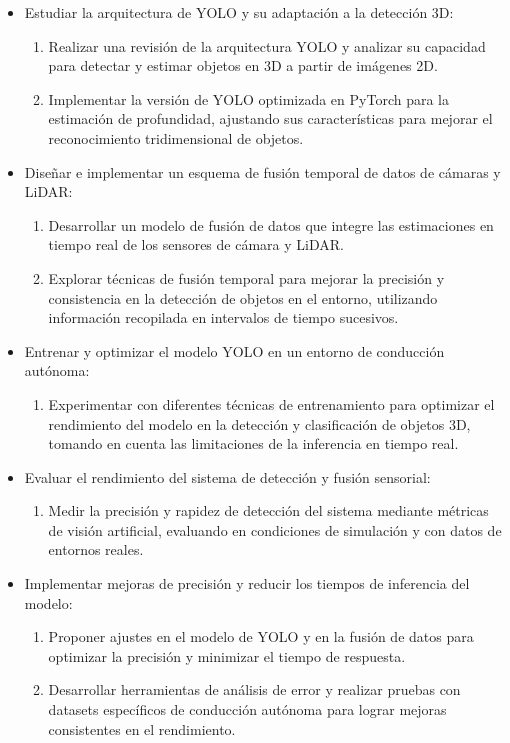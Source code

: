 \begin{itemize}
	\item Estudiar la arquitectura de YOLO y su adaptación a la detección 3D:
	\begin{enumerate}
		\item Realizar una revisión de la arquitectura YOLO y analizar su capacidad para detectar y estimar objetos en 3D a partir de imágenes 2D.
		\item Implementar la versión de YOLO optimizada en PyTorch para la estimación de profundidad, ajustando sus características para mejorar el reconocimiento tridimensional de objetos.
	\end{enumerate}
	
	\item Diseñar e implementar un esquema de fusión temporal de datos de cámaras y LiDAR:
	\begin{enumerate}
		\item Desarrollar un modelo de fusión de datos que integre las estimaciones en tiempo real de los sensores de cámara y LiDAR.
		\item Explorar técnicas de fusión temporal para mejorar la precisión y consistencia en la detección de objetos en el entorno, utilizando información recopilada en intervalos de tiempo sucesivos.
	\end{enumerate}
	
	\item Entrenar y optimizar el modelo YOLO en un entorno de conducción autónoma:
	\begin{enumerate}
		\item Experimentar con diferentes técnicas de entrenamiento para optimizar el rendimiento del modelo en la detección y clasificación de objetos 3D, tomando en cuenta las limitaciones de la inferencia en tiempo real.
	\end{enumerate}
	
	\item Evaluar el rendimiento del sistema de detección y fusión sensorial:
	\begin{enumerate}
		\item Medir la precisión y rapidez de detección del sistema mediante métricas de visión artificial, evaluando en condiciones de simulación y con datos de entornos reales.
	\end{enumerate}
	
	\item Implementar mejoras de precisión y reducir los tiempos de inferencia del modelo:
	\begin{enumerate}
		\item Proponer ajustes en el modelo de YOLO y en la fusión de datos para optimizar la precisión y minimizar el tiempo de respuesta.
		\item Desarrollar herramientas de análisis de error y realizar pruebas con datasets específicos de conducción autónoma para lograr mejoras consistentes en el rendimiento.
	\end{enumerate}
\end{itemize}

